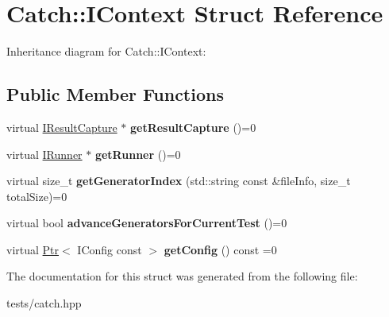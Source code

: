 \hypertarget{struct_catch_1_1_i_context}{}\section{Catch\+:\+:I\+Context Struct Reference}
\label{struct_catch_1_1_i_context}


Inheritance diagram for Catch\+:\+:I\+Context\+:
\subsection*{Public Member Functions}
\begin{DoxyCompactItemize}
\item 
\mbox{\label{struct_catch_1_1_i_context_a684e4ae71d1fdf3060c352ecde1d122f}} 
virtual \hyperlink{struct_catch_1_1_i_result_capture}{I\+Result\+Capture} $\ast$ {\bfseries get\+Result\+Capture} ()=0
\item 
\mbox{\label{struct_catch_1_1_i_context_af088415dde18d039ed5a2f95b02767c6}} 
virtual \hyperlink{struct_catch_1_1_i_runner}{I\+Runner} $\ast$ {\bfseries get\+Runner} ()=0
\item 
\mbox{\label{struct_catch_1_1_i_context_a43e07088db43299ba129fbe6d3106e95}} 
virtual size\+\_\+t {\bfseries get\+Generator\+Index} (std\+::string const \&file\+Info, size\+\_\+t total\+Size)=0
\item 
\mbox{\label{struct_catch_1_1_i_context_a806f7c4ed24d51adae90418e661b24b7}} 
virtual bool {\bfseries advance\+Generators\+For\+Current\+Test} ()=0
\item 
\mbox{\label{struct_catch_1_1_i_context_aee81c415899262e096ad8d6f686fa365}} 
virtual \hyperlink{class_catch_1_1_ptr}{Ptr}$<$ I\+Config const  $>$ {\bfseries get\+Config} () const =0
\end{DoxyCompactItemize}


The documentation for this struct was generated from the following file\+:\begin{DoxyCompactItemize}
\item 
tests/catch.\+hpp\end{DoxyCompactItemize}
